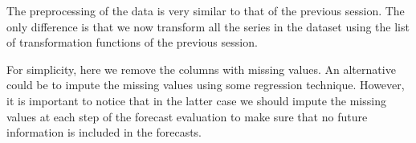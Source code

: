 \documentclass[
]{book}
\newenvironment{Shaded}{\begin{snugshade}}{\end{snugshade}}
\newcommand{\DecValTok}[1]{\textcolor[rgb]{0.00,0.00,0.81}{#1}}
\newcommand{\DocumentationTok}[1]{\textcolor[rgb]{0.56,0.35,0.01}{\textbf{\textit{#1}}}}
\newcommand{\FunctionTok}[1]{\textcolor[rgb]{0.13,0.29,0.53}{\textbf{#1}}}
\newcommand{\NormalTok}[1]{#1}
\newcommand{\OtherTok}[1]{\textcolor[rgb]{0.56,0.35,0.01}{#1}}
\newcommand{\SpecialCharTok}[1]{\textcolor[rgb]{0.81,0.36,0.00}{\textbf{#1}}}
\newcommand{\StringTok}[1]{\textcolor[rgb]{0.31,0.60,0.02}{#1}}
\begin{document}
The preprocessing of the data is very similar to that of the previous session. The only difference is that we now transform all the series in the dataset using the list of transformation functions of the previous session.

For simplicity, here we remove the columns with missing values. An alternative could be to impute the missing values using some regression technique. However, it is important to notice that in the latter case we should impute the missing values at each step of the forecast evaluation to make sure that no future information is included in the forecasts.

\begin{Shaded}
\end{Shaded}
\end{document}
